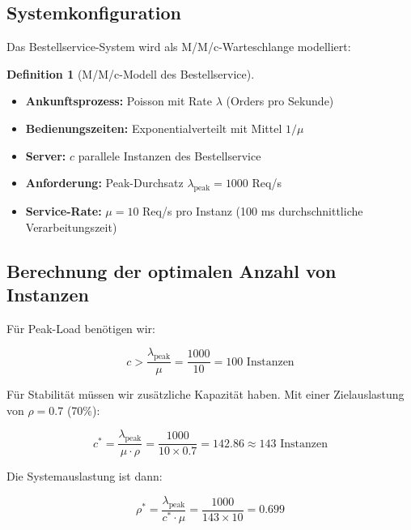 \documentclass[a4paper,11pt]{article}
\theoremstyle{definition}
\newtheorem{definition}{Definition}
\begin{document}
\subsection{Systemkonfiguration}

Das Bestellservice-System wird als M/M/c-Warteschlange modelliert:

\begin{definition}[M/M/c-Modell des Bestellservice]
    \label{def:order_queue}
    
    \begin{itemize}
        \item \textbf{Ankunftsprozess:} Poisson mit Rate $\lambda$ (Orders pro Sekunde)
        \item \textbf{Bedienungszeiten:} Exponentialverteilt mit Mittel $1/\mu$
        \item \textbf{Server:} $c$ parallele Instanzen des Bestellservice
        \item \textbf{Anforderung:} Peak-Durchsatz $\lambda_{\text{peak}} = 1000$ Req/s
        \item \textbf{Service-Rate:} $\mu = 10$ Req/s pro Instanz (100 ms durchschnittliche Verarbeitungszeit)
    \end{itemize}
\end{definition}

\subsection{Berechnung der optimalen Anzahl von Instanzen}

Für Peak-Load benötigen wir:

\[
c > \frac{\lambda_{\text{peak}}}{\mu} = \frac{1000}{10} = 100 \text{ Instanzen}
\]

Für Stabilität müssen wir zusätzliche Kapazität haben. Mit einer Zielauslastung von $\rho = 0.7$ 
(70\%):

\[
c^* = \frac{\lambda_{\text{peak}}}{\mu \cdot \rho} = \frac{1000}{10 \times 0.7} = 142.86 \approx 143 \text{ Instanzen}
\]

Die Systemauslastung ist dann:

\[
\rho^* = \frac{\lambda_{\text{peak}}}{c^* \cdot \mu} = \frac{1000}{143 \times 10} = 0.699
\]


    
\end{document}
